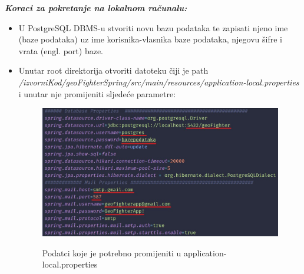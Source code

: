 			\textbf{\textit{Koraci za pokretanje na lokalnom računalu:}}
			
			\begin{itemize}
				
				\item U PostgreSQL DBMS-u stvoriti novu bazu podataka te zapisati njeno ime (baze podataka) uz ime korisnika-vlasnika baze podataka, njegovu šifre i vrata (engl. port) baze.
				
				\item Unutar root direktorija otvoriti datoteku čiji je path\\ \textit{/izvorniKod/geoFighterSpring/src/main/resources/application-local.properties}\\ i unutar nje promijeniti sljedeće parametre: 
			
				\begin{figure}[H]
					\centering
					\includegraphics[scale=0.4]{slike/Properties} \\%
					\caption{Podatci koje je potrebno promijeniti u application-local.properties}
					\label{fig:properties} %
				\end{figure}
			

\end{itemize}
